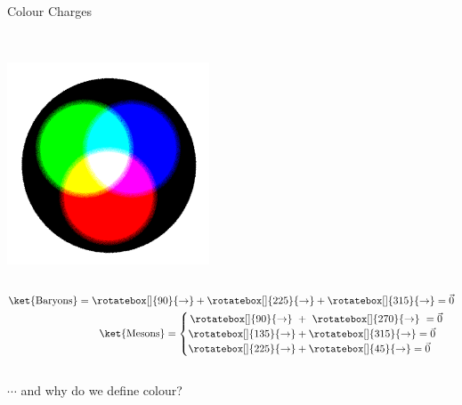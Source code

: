 \begin{frame}{Colour Charges}
    \begin{column}{.58\textwidth}
\\ \includegraphics[width=6cm]{Figures Introductory Lecture/Standard Model/BlackAdditiveColours.png}
\end{column}%
\begin{column}{.42\textwidth}

\begin{align*}
    \ket{\textmd{Baryons}}=\rotatebox[]{90}{\rightarrow}+\rotatebox[]{225}{\rightarrow}+\rotatebox[]{315}{\rightarrow}=\Vec{0}\\ 
    \ket{\textmd{Mesons}}=
    \begin{cases} \,\rotatebox[]{90}{\rightarrow}~+~\rotatebox[]{270}{\rightarrow}~=\Vec{0}\\
    \rotatebox[]{135}{\rightarrow}+\rotatebox[]{315}{\rightarrow}=\Vec{0}\\
    \rotatebox[]{225}{\rightarrow}+\rotatebox[]{45}{\rightarrow}=\Vec{0}
    \end{cases} 
\end{align*} %
 \\ %

 $\cdots$ and why do we define colour?
 \end{column}
 \end{frame}

